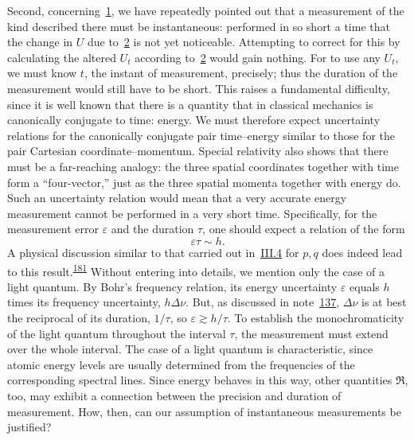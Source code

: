 \documentclass[fontsize=13pt,twoside,openany,headings=normal,parskip=false,bookmarkpackage=false,DIV=calc]{scrbook}
\begin{document}
Second, concerning~\hyperref[eq:V.1.1]{1}, we have repeatedly pointed out that a measurement of the kind described there must be instantaneous: performed in so short a time that the change in $U$ due to~\hyperref[eq:V.1.2]{2} is not yet noticeable. Attempting to correct for this by calculating the altered $U_t$ according to~\hyperref[eq:V.1.2]{2} would gain nothing. For to use any $U_t$, we must know $t$, the instant of measurement, precisely; thus the duration of the measurement would still have to be short. This raises a fundamental difficulty, since it is well known that there is a quantity
\hypertarget{origpage-188}{}%
that in classical mechanics is canonically conjugate to time: energy. We must therefore expect uncertainty relations for the canonically conjugate pair time--energy similar to those for the pair Cartesian coordinate--momentum. Special relativity also shows that there must be a far-reaching analogy: the three spatial coordinates together with time form a ``four-vector,'' just as the three spatial momenta together with energy do. Such an uncertainty relation would mean that a very accurate energy measurement cannot be performed in a very short time. Specifically, for the measurement error $\varepsilon$ and the duration $\tau$, one should expect a relation of the form
\[
\varepsilon\tau\sim h.
\]
A physical discussion similar to that carried out in~\hyperref[sec:III.4]{III.4} for $p,q$ does indeed lead to this result.\textsuperscript{\hyperlink{note-181}{181}} Without entering into details, we mention only the case of a light quantum. By Bohr's frequency relation, its energy uncertainty $\varepsilon$ equals $h$ times its frequency uncertainty, $h\Delta\nu$. But, as discussed in note~\hyperlink{note-137}{137}, $\Delta\nu$ is at best the reciprocal of its duration, $1/\tau$, so $\varepsilon\gtrsim h/\tau$. To establish the monochromaticity of the light quantum throughout the interval $\tau$, the measurement must extend over the whole interval. The case of a light quantum is characteristic, since atomic energy levels are usually determined from the frequencies of the corresponding spectral lines. Since energy behaves in this way, other quantities $\mathfrak R$, too, may exhibit a connection between the precision and duration of measurement. How, then, can our assumption of instantaneous measurements be justified?
\end{document}
